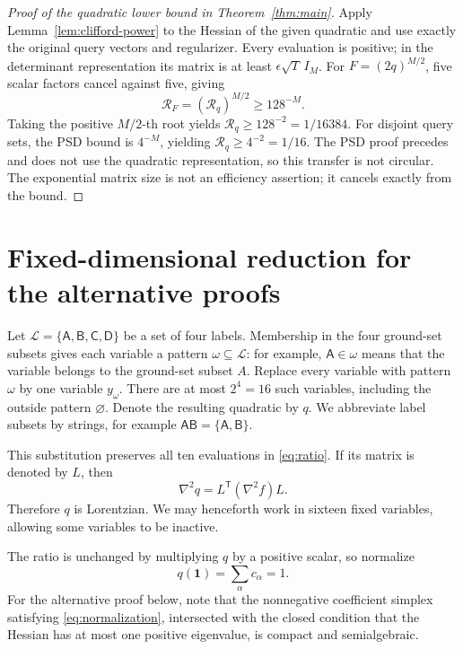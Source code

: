 \documentclass[11pt]{article}
\theoremstyle{remark}
\newcommand{\one}{\mathbf{1}}
\begin{document}
\begin{proof}[Proof of the quadratic lower bound in Theorem~\ref{thm:main}]
Apply Lemma~\ref{lem:clifford-power} to the Hessian of the given
quadratic and use exactly the original query vectors and regularizer.
Every evaluation is positive; in the determinant representation its
matrix is at least $\epsilon\sqrt T\,I_M$.
For $F=(2q)^{M/2}$, five scalar factors cancel against five, giving
\[
 \mathcal R_F=(\mathcal R_q)^{M/2}\ge128^{-M}.
\]
Taking the positive $M/2$-th root yields
$\mathcal R_q\ge128^{-2}=1/16384$.
For disjoint query sets, the PSD bound is $4^{-M}$, yielding
$\mathcal R_q\ge4^{-2}=1/16$.
The PSD proof precedes and does not use the quadratic representation,
so this transfer is not circular.  The exponential matrix size is not
an efficiency assertion; it cancels exactly from the bound.
\end{proof}

\section{Fixed-dimensional reduction for the alternative proofs}

Let $\mathcal L=\{\mathsf A,\mathsf B,\mathsf C,\mathsf D\}$ be a set of
four labels.  Membership in the four ground-set subsets gives each variable a
pattern $\omega\subseteq\mathcal L$: for example,
$\mathsf A\in\omega$ means that the variable belongs to the ground-set subset
$A$.  Replace every variable with pattern $\omega$ by one variable
$y_\omega$.  There are at most $2^4=16$ such variables, including the outside
pattern $\varnothing$.  Denote the resulting quadratic by $q$.
We abbreviate label subsets by strings, for example
$\mathsf{AB}=\{\mathsf A,\mathsf B\}$.

This substitution preserves all ten evaluations in \eqref{eq:ratio}.  If its
matrix is denoted by $L$, then
\[
 \nabla^2q=L^{\mathsf T}(\nabla^2f)L.
\]
Therefore $q$ is Lorentzian.  We may henceforth work in sixteen fixed
variables, allowing some variables to be inactive.

The ratio is unchanged by multiplying $q$ by a positive scalar, so normalize
\begin{equation}
 q(\one)=\sum_\alpha c_\alpha=1.
 \label{eq:normalization}
\end{equation}
For the alternative proof below, note that the nonnegative coefficient
simplex satisfying \eqref{eq:normalization},
intersected with the closed condition that the Hessian has at most one
positive eigenvalue, is compact and semialgebraic.
\end{document}
